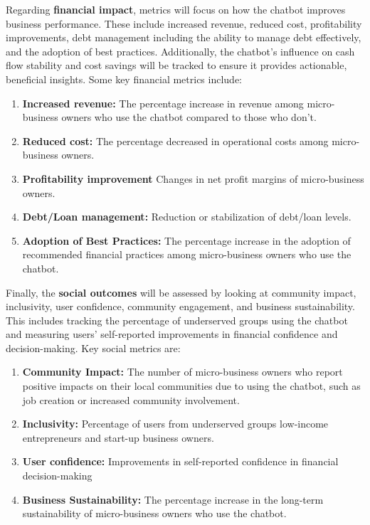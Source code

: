 \documentclass{article}
\begin{document}
Regarding \textbf{financial impact}, metrics will focus on how the chatbot improves business performance. These include increased revenue, reduced cost,  profitability improvements, debt management including the ability to manage debt effectively, and the adoption of best practices. Additionally, the chatbot’s influence on cash flow stability and cost savings will be tracked to ensure it provides actionable, beneficial insights. Some key financial metrics include:

\begin{enumerate}[label=(\alph*)]
    \item \textbf{Increased revenue:} The percentage increase in revenue among micro-business owners who use the chatbot compared to those who don't.
    \item \textbf{Reduced cost:} The percentage decreased in operational costs among micro-business owners.
    \item \textbf{Profitability improvement} Changes in net profit margins of micro-business owners.
    \item \textbf{Debt/Loan management:} Reduction or stabilization of debt/loan levels. 
    \item \textbf{Adoption of Best Practices:} The percentage increase in the adoption of recommended financial practices among micro-business owners who use the chatbot.
\end{enumerate}

Finally, the \textbf{social outcomes} will be assessed by looking at community impact, inclusivity, user confidence, community engagement, and business sustainability. This includes tracking the percentage of underserved groups using the chatbot and measuring users' self-reported improvements in financial confidence and decision-making. Key social metrics are:
\begin{enumerate}[label=(\alph*)]

\item \textbf{Community Impact:} The number of micro-business owners who report positive impacts on their local communities due to using the chatbot, such as job creation or increased community involvement.
\item \textbf{Inclusivity:} Percentage of users from underserved groups low-income entrepreneurs and start-up business owners.
\item \textbf{User confidence:} Improvements in self-reported confidence in financial decision-making
\item \textbf{Business Sustainability:} The percentage increase in the long-term sustainability of micro-business owners who use the chatbot.
\end{enumerate}
\end{document}
